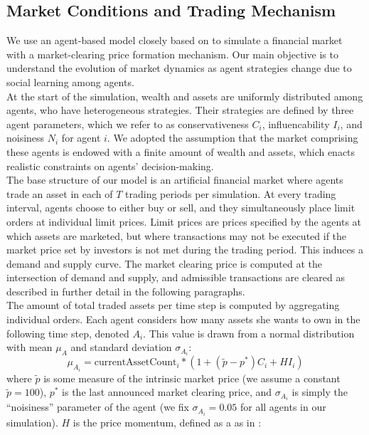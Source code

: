 \documentclass[11pt]{article}
\begin{document}
\subsection{Market Conditions and Trading Mechanism}
We use an agent-based model closely based on \citet{raberto2001agent} to simulate a financial market with a market-clearing price formation mechanism. Our main objective is to understand the evolution of market dynamics as agent strategies change due to social learning among agents. \\
At the start of the simulation, wealth and assets are uniformly distributed among agents, who have heterogeneous strategies. Their strategies are defined by three agent parameters, which we refer to as conservativeness $C_i$, influencability $I_i$, and noisiness $N_i$ for agent $i$. We adopted the assumption that the market comprising these agents is endowed with a finite amount of wealth and assets, which enacts realistic constraints on agents' decision-making. \\
The base structure of our model is an artificial financial market where agents trade an asset in each of $T$ trading periods per simulation. At every trading interval, agents choose to either buy or sell, and they simultaneously place limit orders at individual limit prices. Limit prices are prices specified by the agents at which assets are marketed, but where transactions may not be executed if the market price set by investors is not met during the trading period. This induces a demand and supply curve. The market clearing price is computed at the intersection of demand and supply, and admissible transactions are cleared as described in further detail in the following paragraphs. \\
The amount of total traded assets per time step is computed by aggregating individual orders. Each agent considers how many assets she wants to own in the following time step, denoted $A_i$. This value is drawn from a normal distribution with mean $\mu_A$ and standard deviation $\sigma_{A_i}$:
\begin{equation}
\mu_{A_i} = \text{currentAssetCount}_i * (1 + (\tilde{p} - p^{*}) C_i + H I_i)
\end{equation}
where $\tilde{p}$ is some measure of the intrinsic market price (we assume a constant $\tilde{p}=100$), $p^*$ is the last announced market clearing price, and $\sigma_{A_i}$ is simply the ``noisiness'' parameter of the agent (we fix $\sigma_{A_i} = 0.05$ for all agents in our simulation). $H$ is the price momentum, defined as a as in \citet {kaizoji2015super}:
\end{document}
